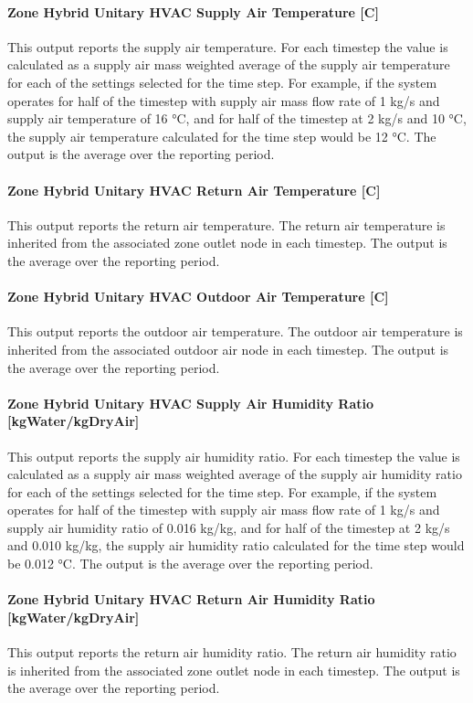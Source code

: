 \paragraph{Zone Hybrid Unitary HVAC Supply Air Temperature [\si{C}]}
This output reports the supply air temperature. For each timestep the value is calculated as a supply air mass weighted average of the supply air temperature for each of the settings selected for the time step. For example, if the system operates for half of the timestep with supply air mass flow rate of 1 kg/s and supply air temperature of 16 °\si{C}, and for half of the timestep at 2 kg/s and 10 °\si{C}, the supply air temperature calculated for the time step would be 12 °\si{C}. The output is the average over the reporting period.

\paragraph{Zone Hybrid Unitary HVAC Return Air Temperature [\si{C}]}
This output reports the return air temperature. The return air temperature is inherited from the associated zone outlet node in each timestep. The output is the average over the reporting period.

\paragraph{Zone Hybrid Unitary HVAC Outdoor Air Temperature [\si{C}]}
This output reports the outdoor air temperature.  The outdoor air temperature is inherited from the associated outdoor air node in each timestep.  The output is the average over the reporting period.

\paragraph{Zone Hybrid Unitary HVAC Supply Air Humidity Ratio [kgWater/kgDryAir]}
This output reports the supply air humidity ratio. For each timestep the value is calculated as a supply air mass weighted average of the supply air humidity ratio for each of the settings selected for the time step. For example, if the system operates for half of the timestep with supply air mass flow rate of 1 kg/s and supply air humidity ratio of 0.016 kg/kg, and for half of the timestep at 2 kg/s and 0.010 kg/kg, the supply air humidity ratio calculated for the time step would be 0.012 °\si{C}. The output is the average over the reporting period.

\paragraph{Zone Hybrid Unitary HVAC Return Air Humidity Ratio [kgWater/kgDryAir]}
This output reports the return air humidity ratio. The return air humidity ratio is inherited from the associated zone outlet node in each timestep.  The output is the average over the reporting period.

